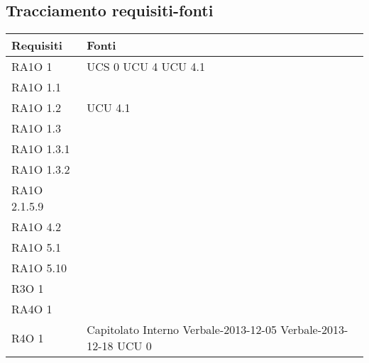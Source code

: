 \subsection{Tracciamento requisiti-fonti}
      \begin{center}
      \bgroup
      \def\arraystretch{1.8}
      \begin{longtable}{ | p{5cm} | p{5cm} |}
    
      \cellcolor[gray]{0.9} \textbf{Requisiti} & \cellcolor[gray]{0.9} \textbf{Fonti} \\ \hline       
        RA1O 1 &  UCS 0 \newline  UCU 4 \newline  UCU 4.1 \newline  \\ \hline      
        RA1O 1.1 &  \\ \hline      
        RA1O 1.2 &  UCU 4.1 \newline  \\ \hline      
        RA1O 1.3 &  \\ \hline      
        RA1O 1.3.1 &  \\ \hline      
        RA1O 1.3.2 &  \\ \hline      
        RA1O 2.1.5.9 &  \\ \hline      
        RA1O 4.2 &  \\ \hline      
        RA1O 5.1 &  \\ \hline      
        RA1O 5.10 &  \\ \hline      
        R3O 1 &  \\ \hline      
        RA4O 1 &  \\ \hline      
        R4O 1 &  Capitolato \newline  Interno \newline  Verbale-2013-12-05 \newline  Verbale-2013-12-18 \newline  UCU 0 \newline  \\ \hline     
      \end{longtable}
      \egroup
      \end{center}  
\clearpage

